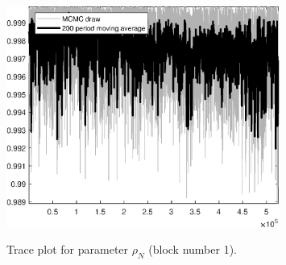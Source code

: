 \begin{figure}[H]
\centering
  \includegraphics[width=0.8\textwidth]{BRS_growth_KPR/graphs/TracePlot_rho_N_blck_1}\\
    \caption{Trace plot for parameter ${\rho_N}$ (block number 1).}
\end{figure}
